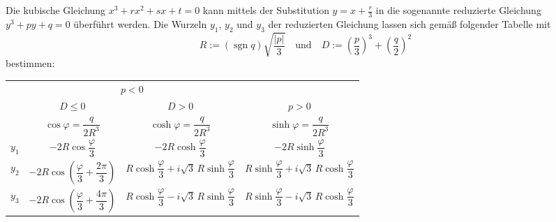 \documentclass[12pt]{article}
\begin{document}
Die kubische Gleichung $x^3 + rx^2 + sx + t = 0$ kann mittels der Substitution
$y = x + \frac{r}{3}$ in die sogenannte reduzierte Gleichung $y^3 + py + q = 0$
überführt werden. Die Wurzeln $y_1$, $y_2$ und $y_3$ der reduzierten Gleichung
lassen sich gemäß folgender Tabelle mit
\[
  R := (\operatorname{sgn} q)\sqrt{\frac{|p|}{3}}
  \quad \text{und} \quad
  D := \left(\frac{p}{3}\right)^{\!3} + \left(\frac{q}{2}\right)^{\!2}
\]
bestimmen:

\renewcommand{\arraystretch}{1.6}
\begin{center}
\begin{tabular}{c || c | c | c}
  \multicolumn{1}{c}{} & \multicolumn{2}{c|}{$p < 0$} & \\
  \cline{2-3}
  \multicolumn{1}{c}{} & $D \leq 0$ & $D > 0$ & $p > 0$ \\
  \hhline{~|=|=|=}
  \multicolumn{1}{c|}{} & $\cos\varphi = \dfrac{q}{2R^3}$
  & $\cosh\varphi = \dfrac{q}{2R^3}$
  & $\sinh\varphi = \dfrac{q}{2R^3}$ \\
  \hhline{~|=|=|=}
  $y_1$ & $-2R\cos\dfrac{\varphi}{3}$
        & $-2R\cosh\dfrac{\varphi}{3}$
        & $-2R\sinh\dfrac{\varphi}{3}$ \\
  \hline
  $y_2$ & $-2R\cos\!\left(\dfrac{\varphi}{3}+\dfrac{2\pi}{3}\right)$
        & $R\cosh\dfrac{\varphi}{3}+i\sqrt{3}\,R\sinh\dfrac{\varphi}{3}$
        & $R\sinh\dfrac{\varphi}{3}+i\sqrt{3}\,R\cosh\dfrac{\varphi}{3}$ \\
  \hline
  $y_3$ & $-2R\cos\!\left(\dfrac{\varphi}{3}+\dfrac{4\pi}{3}\right)$
        & $R\cosh\dfrac{\varphi}{3}-i\sqrt{3}\,R\sinh\dfrac{\varphi}{3}$
        & $R\sinh\dfrac{\varphi}{3}-i\sqrt{3}\,R\cosh\dfrac{\varphi}{3}$ \\
\end{tabular}
\end{center}
\end{document}
